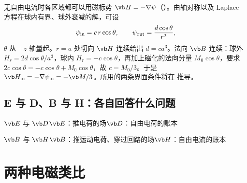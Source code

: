 \begin{deeper}[磁化球内部场的推导]
无自由电流时各区域都可以用磁标势 $\vb H=-\nabla\psi$（）。由轴对称以及 Laplace 方程在球内有界、球外衰减的解，可设
\begin{equation*}
\psi_{\rm in}=c\,r\cos\theta,\qquad \psi_{\rm out}=\frac{d\cos\theta}{r^2},
\end{equation*}
$\theta$ 从 $+z$ 轴量起。$r=a$ 处切向 $\vb H$ 连续给出 $d=ca^3$。法向 $\vb B$ 连续：球外 $H_r=2d\cos\theta/a^3$，球内 $H_r=-c\cos\theta$，再加上磁化的法向分量 $M_0\cos\theta$，要求 $2c\cos\theta=-c\cos\theta+M_0\cos\theta$，故 $c=M_0/3$。于是 $\vb H_{\rm in}=-\nabla\psi_{\rm in}=-\vb M/3$。所用的两条界面条件将在 推导。
\end{deeper}

\subsection{E 与 D、B 与 H：各自回答什么问题}

\begin{compare}{$\vb E$ 与 $\vb D$}{$\vb E$：推电荷的场}{$\vb D$：自由电荷的账本}
\end{compare}

\begin{compare}{$\vb B$ 与 $\vb H$}{$\vb B$：推运动电荷、穿过回路的场}{$\vb H$：自由电流的账本}
\end{compare}

\section{两种电磁类比}\label{sec:matter-analogy}

